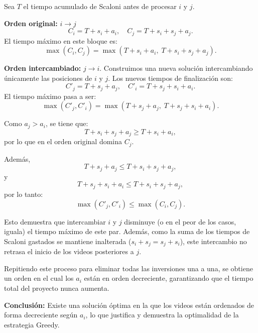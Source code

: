 Sea $T$ el tiempo acumulado de Scaloni antes de procesar $i$ y $j$.

\textbf{Orden original:} $i \rightarrow j$
\[
C_i = T + s_i + a_i, \quad
C_j = T + s_i + s_j + a_j.
\]
El tiempo máximo en este bloque es:
\[
\max(C_i, C_j) = \max(T + s_i + a_i,\; T + s_i + s_j + a_j).
\]

\textbf{Orden intercambiado:} $j \rightarrow i$.
Construimos una nueva solución intercambiando únicamente las posiciones de $i$ y $j$. Los nuevos tiempos de finalización son:
\[
C'_j = T + s_j + a_j, \quad
C'_i = T + s_j + s_i + a_i.
\]
El tiempo máximo pasa a ser:
\[
\max(C'_j, C'_i) = \max(T + s_j + a_j,\; T + s_j + s_i + a_i).
\]

Como $a_j > a_i$, se tiene que:
\[
T + s_i + s_j + a_j \ge T + s_i + a_i,
\]
por lo que en el orden original domina $C_j$.

Además,
\[
T + s_j + a_j \le T + s_i + s_j + a_j,
\]
y
\[
T + s_j + s_i + a_i \le T + s_i + s_j + a_j,
\]
por lo tanto:
\[
\max(C'_j, C'_i) \le \max(C_i, C_j).
\]

Esto demuestra que intercambiar $i$ y $j$ disminuye (o en el peor de los casos, iguala) el tiempo máximo de este par. Además, como la suma de los tiempos de Scaloni gastados se mantiene inalterada ($s_i + s_j = s_j + s_i$), este intercambio no retrasa el inicio de los videos posteriores a $j$.

Repitiendo este proceso para eliminar todas las inversiones una a una, se obtiene un orden en el cual los $a_i$ están en orden decreciente, garantizando que el tiempo total del proyecto nunca aumenta.

\textbf{Conclusión:} Existe una solución óptima en la que los videos están ordenados de forma decreciente según $a_i$, lo que justifica y demuestra la optimalidad de la estrategia Greedy.
